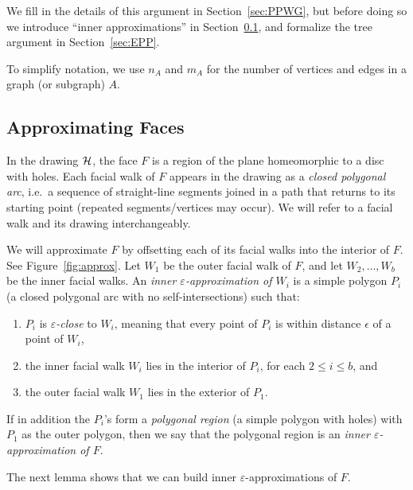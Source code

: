 \documentclass{llncs}
\newcommand{\remove}[1]{}
\begin{document}
We fill in the details of this argument in Section~\ref{sec:PPWG}, but before doing so we introduce ``inner approximations'' in Section~\ref{sec:AF},
and formalize the tree argument in Section~\ref{sec:EPP}.

To simplify notation, we use $n_A$ and $m_A$ for the number of vertices and edges in a graph (or subgraph) $A$.

\subsection{Approximating Faces}\label{sec:AF}

In the drawing $\cal H$, the face $F$ is a region of the plane
homeomorphic to a disc with holes.  Each facial walk of $F$ appears in the drawing as a  {\em closed polygonal arc}, i.e.~a sequence of straight-line segments joined in a path that returns to its starting point (repeated segments/vertices may occur).
We will refer to a facial walk and its drawing interchangeably.

We will approximate $F$ by offsetting each of its facial walks into the interior of $F$.
See Figure~\ref{fig:approx}.
Let $W_1$ be the outer facial walk of $F$, and let $W_2, \ldots, W_b$ be the inner facial walks.
An {\em inner $\varepsilon$-approximation of $W_i$} is a simple polygon $P_i$ (a closed polygonal arc with no self-intersections) such that:
\begin{enumerate}
\item $P_i$  is $\varepsilon${\em-close} to  $W_i$, meaning that every point of $P_i$ is within distance $\epsilon$ of a point of $W_i$,
\item the inner facial walk $W_i$ lies in the interior of $P_i$, for each $2\leq i\leq b$, and
\item the outer facial walk $W_1$ lies in the exterior of $P_1$.
\end{enumerate}
If in addition the $P_i$'s form a {\em polygonal region} (a simple polygon with holes) with $P_1$ as the outer polygon, then we say that the polygonal region is an  {\em inner $\varepsilon$-approximation of $F$}.
\remove{The {\em Hausdorff distance} $d_H(A,B)$ of two sets (in a space with metric $d$) is defined as\footnote{The underlying metric $d$ can be Euclidean or some other appropriate metric.}\\  {\begin{center} $\max\left\{\sup_{a \in A} \inf_{b \in B} d(a,b), \sup_{b \in B} \inf_{a \in A} d(a,b)\right\}$.\end{center}} Intuitively, the Hausdorff distance measures how far a point in one set can be from the other set. Sets $A$ and $B$ are {\em $\varepsilon$-close} if $d_H(A,B) < \varepsilon$. Then $A$ is an {\em inner $\varepsilon$-approximation of $B$} if they are $\varepsilon$-close and there is a $\delta>0$ so that all the points $\delta$-close to $A$ are a subset of $B$.
}
The next lemma shows that we can build inner $\varepsilon$-approximations of $F$. 
\end{document}
